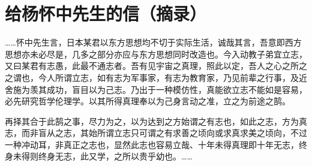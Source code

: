 \section{给杨怀中先生的信（摘录）}


……怀中先生言，日本某君以东方思想均不切于实际生活，诚哉其言，吾意即西方思想亦未必尽是，几多之部分亦应与东方思想同时改造也。今入动教子弟宜立志，又曰某君有志愚，此最不通志者。吾有见宇宙之真理，照此以定，吾人之心之所之之谓也，今人所谓立志，如有志为军事家，有志为教育家，乃见前辈之行事，及近舍施为羡其成功，盲目以为己志。乃出于一种模仿性，真能欲立志不能如是容易，必先研究哲学伦理学。以其所得真理奉以为己身言动之准，立之为前途之鹄。

再择其合于此鹄之事，尽力为之，以为达到之方始谓之有志也，如此之志，方为真志，而非盲从之志，其始所谓立志只可谓之有求善之顷向或求真求美之顷向，不过一种冲动耳，非真正之志也，显然此志也容易立哉、十年未得真理即十年无志，终身未得则终身无志，此又学，之所以贵乎幼也。……

